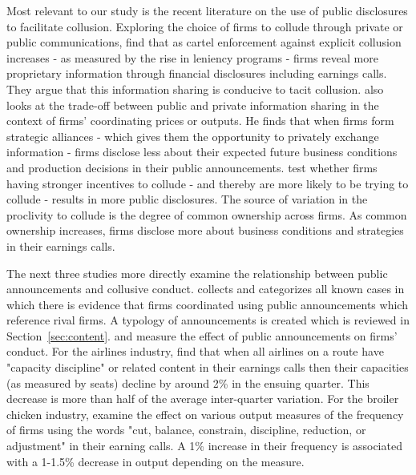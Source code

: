 Most relevant to our study is the recent literature on the use of public
disclosures to facilitate collusion. Exploring the choice of firms to
collude through private or public communications, \textcite{bourveau2020corporate}
find that as cartel enforcement against explicit collusion
increases - as measured by the rise in leniency programs - firms reveal more
proprietary information through financial disclosures including earnings
calls. They argue that this information sharing is conducive to tacit collusion.
 \textcite{kepler2021private} also looks at the trade-off between public
and private information sharing in the context of firms' coordinating prices
or outputs. He finds that when firms form strategic alliances - which gives
them the opportunity to privately exchange information - firms disclose less
about their expected future business conditions and production decisions in
their public announcements. \textcite{pawliczek2022facilitating} test
whether firms having stronger incentives to collude - and thereby are more
likely to be trying to collude - results in more public disclosures. The
source of variation in the proclivity to collude is the degree of common
ownership across firms. As common ownership increases, firms disclose more
about business conditions and strategies in their earnings calls.

The next three studies more directly examine the relationship between public
announcements and collusive conduct. \textcite{harrington2022collusion} collects and
categorizes all known cases in which there is evidence that firms
coordinated using public announcements which reference rival firms. A
typology of announcements is created which is reviewed in Section~\ref{sec:content}. \textcite{aryal2022coordinated}
and \textcite{sheng2024public} measure the effect of public
announcements on firms' conduct. For the airlines industry, \textcite{aryal2022coordinated}
find that when all airlines on a route have "capacity discipline" or
related content in their earnings calls then their capacities (as measured
by seats) decline by around 2\% in the ensuing quarter. This decrease is
more than half of the average inter-quarter variation. For the broiler chicken industry, \textcite{sheng2024public}
examine the effect on various output measures of the frequency of firms using the words "cut,
balance, constrain, discipline, reduction, or adjustment" in their earning
calls. A 1\% increase in their frequency is
associated with a 1-1.5\% decrease in output depending on the measure.

